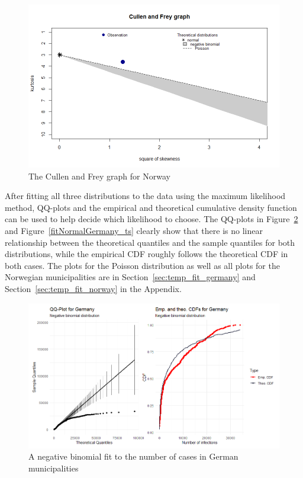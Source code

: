 \begin{figure}[H]
  \centering
  \includegraphics[width = \textwidth]{cf_norway_ts.png}
  \caption{The Cullen and Frey graph for Norway}
  \label{cf_norway_ts}
\end{figure}
After fitting all three distributions to the data using the maximum likelihood method, QQ-plots and the empirical and theoretical cumulative density function can be used to help decide which likelihood to choose. The QQ-plots in Figure~\ref{fitNegbinomGermany_ts} and Figure~\ref{fitNormalGermany_ts} clearly show that there is no linear relationship between the theoretical quantiles and the sample quantiles for both distributions, while the empirical CDF roughly follows the theoretical CDF in both cases. The plots for the Poisson distribution as well as all plots for the Norwegian municipalities are in Section~\ref{sec:temp_fit_germany} and Section~\ref{sec:temp_fit_norway} in the Appendix.
\begin{figure}[H]
  \centering
  \includegraphics[width = \textwidth]{fit_nbinom_germany_ts.png}
  \caption{A negative binomial fit to the number of cases in German municipalities}
  \label{fitNegbinomGermany_ts}
\end{figure}
